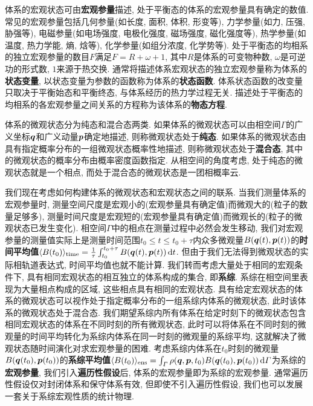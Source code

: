 体系的宏观状态可由\textbf{宏观参量}描述, 处于平衡态的体系的宏观参量具有确定的数值. 常见的宏观参量包括几何参量(如长度, 面积, 体积, 形变等), 力学参量(如力, 压强, 胁强等), 电磁参量(如电场强度, 电极化强度, 磁场强度, 磁化强度等), 热学参量(如温度, 热力学能, 熵, 焓等), 化学参量(如组分浓度, 化学势等). 处于平衡态的均相系的独立宏观参量的数目$ F $满足$ F=R+\omega+1 $, 其中$ R $是体系的可变物种数, $ \omega $是可逆功的形式数, $ 1 $来源于热交换. 通常将描述体系宏观状态的独立宏观参量称为体系的\textbf{状态变量}, 以状态变量为参数的函数称为体系的\textbf{状态函数}. 体系状态函数的改变量只取决于平衡始态和平衡终态, 与体系经历的热力学过程无关. 描述处于平衡态的均相系的各宏观参量之间关系的方程称为该体系的\textbf{物态方程}.

体系的微观状态分为纯态和混合态两类. 如果体系的微观状态可以由相空间$ \varGamma $的广义坐标$ \vb*{q} $和广义动量$ \vb*{p} $确定地描述, 则称微观状态处于\textbf{纯态}. 如果体系的微观状态由具有指定概率分布的一组微观状态概率性地描述, 则称微观状态处于\textbf{混合态}, 其中的微观状态的概率分布由概率密度函数指定. 从相空间的角度考虑, 处于纯态的微观状态就是一个相点, 而处于混合态的微观状态是一团相概率云.

我们现在考虑如何构建体系的微观状态和宏观状态之间的联系. 当我们测量体系的宏观参量时, 测量空间尺度是宏观小的(宏观参量具有确定值)而微观大的(粒子的数量足够多), 测量时间尺度是宏观短的(宏观参量具有确定值)而微观长的(粒子的微观状态已发生变化). 相空间$ \varGamma $中的相点在测量过程中必然会发生移动, 我们对宏观参量的测量值实际上是测量时间范围$ t_0 \leq t \leq t_0 + \tau $内众多微观量$ B(\vb*{q}(t),\vb*{p}(t)) $的\textbf{时间平均值}$ \langle B(t_0) \rangle_{\mathrm{time}} = \frac{1}{\tau} \int_{t_0}^{t_0+\tau} B(\vb*{q}(t),\vb*{p}(t))\dd{t} $. 但由于我们无法得到微观状态的实际相轨道表达式, 时间平均值也就不能计算. 我们转而考虑大量处于相同的宏观条件下, 具有相同宏观状态的相互独立的体系构成的集合, 即\textbf{系综}. 系综在相空间里表现为大量相点构成的区域, 这些相点具有相同的宏观状态. 具有给定宏观状态的体系的微观状态可以视作处于指定概率分布的一组系综内体系的微观状态, 此时该体系的微观状态处于混合态. 我们期望系综内所有体系在给定时刻下的微观状态包含相同宏观状态的体系在不同时刻的所有微观状态, 此时可以将体系在不同时刻的微观量的时间平均转化为系综内体系在同一时刻的微观量的系综平均, 这就解决了微观状态随时间演化对求宏观参量的困难. 考虑系综内体系在$ t_0 $时刻的微观量$ B(\vb*{q}(t_0),\vb*{p}(t_0)) $的\textbf{系综平均值}$ \langle B(t_0) \rangle_{\mathrm{ens}} = \int_{\varGamma} \rho(\vb*{q},\vb*{p},t_0) B(\vb*{q}(t_0),\vb*{p}(t_0)) \dd{\varGamma} $为系综的\textbf{宏观参量}, 我们引入\textbf{遍历性假设}后, 体系的宏观参量即为系综的宏观参量. 通常遍历性假设仅对封闭体系和保守体系有效, 但即使不引入遍历性假设, 我们也可以发展一套关于系综宏观性质的统计物理.

